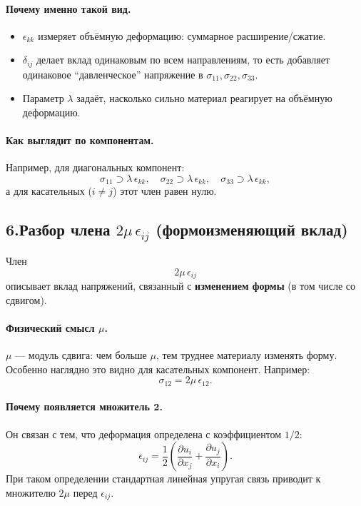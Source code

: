 \paragraph{Почему именно такой вид.}
\begin{itemize}
\item $\epsilon_{kk}$ измеряет объёмную деформацию: суммарное расширение/сжатие.
\item $\delta_{ij}$ делает вклад одинаковым по всем направлениям, то есть добавляет одинаковое ``давленческое''
напряжение в $\sigma_{11},\sigma_{22},\sigma_{33}$.
\item Параметр $\lambda$ задаёт, насколько сильно материал реагирует на объёмную деформацию.
\end{itemize}

\paragraph{Как выглядит по компонентам.}
Например, для диагональных компонент:
\[
\sigma_{11}\supset \lambda\,\epsilon_{kk},\quad
\sigma_{22}\supset \lambda\,\epsilon_{kk},\quad
\sigma_{33}\supset \lambda\,\epsilon_{kk},
\]
а для касательных ($i\neq j$) этот член равен нулю.

\subsection*{6.\;Разбор члена $2\mu\,\epsilon_{ij}$ (формоизменяющий вклад)}
Член 
\[
2\mu\,\epsilon_{ij}
\]
описывает вклад напряжений, связанный с \textbf{изменением формы} (в том числе со сдвигом).

\paragraph{Физический смысл $\mu$.}
$\mu$ --- модуль сдвига: чем больше $\mu$, тем труднее материалу изменять форму.
Особенно наглядно это видно для касательных компонент. Например:
\[
\sigma_{12}=2\mu\,\epsilon_{12}.
\]

\paragraph{Почему появляется множитель $\mathbf{2}$.}
Он связан с тем, что деформация определена с коэффициентом $1/2$:
\[
\epsilon_{ij}=\frac{1}{2}\left(\frac{\partial u_i}{\partial x_j}+\frac{\partial u_j}{\partial x_i}\right).
\]
При таком определении стандартная линейная упругая связь приводит к множителю $2\mu$ перед $\epsilon_{ij}$.

